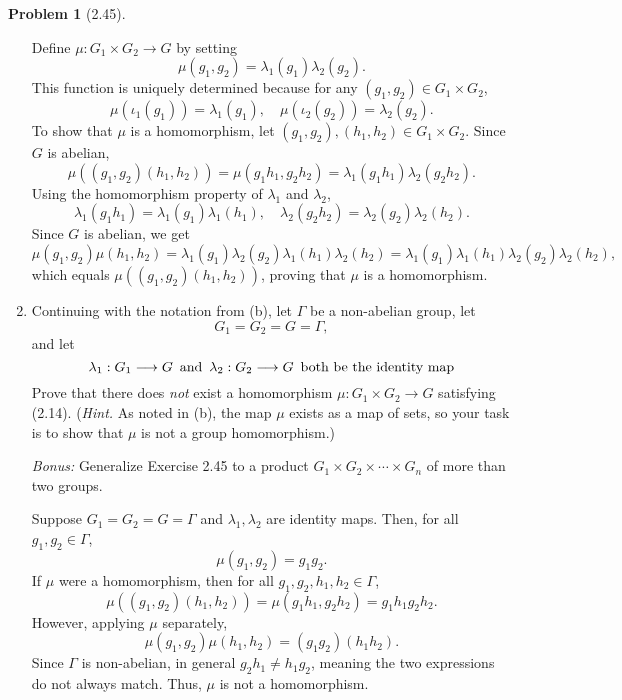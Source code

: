 \documentclass[12pt]{article}
\theoremstyle{definition}
\newtheorem{problem}{Problem}
\begin{document}
\begin{problem}[2.45]
\begin{enumerate}[label=(\alph*)]
              \begin{solution}
                Define $\mu: G_1 \times G_2 \to G$ by setting
                \[ \mu(g_1, g_2) = \lambda_1(g_1) \lambda_2(g_2). \]
                This function is uniquely determined because for any $(g_1, g_2) \in G_1 \times G_2$,
                \[ \mu(\iota_1(g_1)) = \lambda_1(g_1), \quad \mu(\iota_2(g_2)) = \lambda_2(g_2). \]
                To show that $\mu$ is a homomorphism, let $(g_1, g_2), (h_1, h_2) \in G_1 \times G_2$. Since $G$ is abelian,
                \[ \mu((g_1, g_2)(h_1, h_2)) = \mu(g_1h_1, g_2h_2) = \lambda_1(g_1h_1)\lambda_2(g_2h_2). \]
                Using the homomorphism property of $\lambda_1$ and $\lambda_2$,
                \[ \lambda_1(g_1h_1) = \lambda_1(g_1)\lambda_1(h_1), \quad \lambda_2(g_2h_2) = \lambda_2(g_2)\lambda_2(h_2). \]
                Since $G$ is abelian, we get
                \[ \mu(g_1, g_2)\mu(h_1, h_2) = \lambda_1(g_1)\lambda_2(g_2) \lambda_1(h_1)\lambda_2(h_2) = \lambda_1(g_1)\lambda_1(h_1)\lambda_2(g_2)\lambda_2(h_2), \]
                which equals $\mu((g_1, g_2)(h_1, h_2))$, proving that $\mu$ is a homomorphism.

              \end{solution}
        \item Continuing with the notation from (b), let $\Gamma$ be a non-abelian group, let
              \[G_1 = G_2 = G = \Gamma,\]
              and let
              \[ \lambda_1 : G_1 \longrightarrow G \hspace{5px}\text{and}\hspace{5px} \lambda_2 : G_2 \longrightarrow G \hspace{5px}\text{both be the identity map}\]
              Prove that there does \textit{not} exist a homomorphism $\mu : G_1 \times G_2 \longrightarrow G$ satisfying (2.14). (\textit{Hint.} As noted in (b),
              the map $\mu$ exists as a map of sets, so your task is to show that $\mu$ is not a group homomorphism.)

              \textit{Bonus:} Generalize Exercise 2.45 to a product $G_1 \times G_2 \times \cdots \times G_n$ of more than two groups.

              \begin{solution}
                Suppose $G_1 = G_2 = G = \Gamma$ and $\lambda_1, \lambda_2$ are identity maps. Then, for all $g_1, g_2 \in \Gamma$,
                \[ \mu(g_1, g_2) = g_1 g_2. \]
                If $\mu$ were a homomorphism, then for all $g_1, g_2, h_1, h_2 \in \Gamma$,
                \[ \mu((g_1, g_2)(h_1, h_2)) = \mu(g_1 h_1, g_2 h_2) = g_1 h_1 g_2 h_2. \]
                However, applying $\mu$ separately,
                \[ \mu(g_1, g_2) \mu(h_1, h_2) = (g_1 g_2)(h_1 h_2). \]
                Since $\Gamma$ is non-abelian, in general $g_2 h_1 \neq h_1 g_2$, meaning the two expressions do not always match. Thus, $\mu$ is not a homomorphism.

              \end{solution}
    \end{enumerate}

\end{problem}
\end{document}
